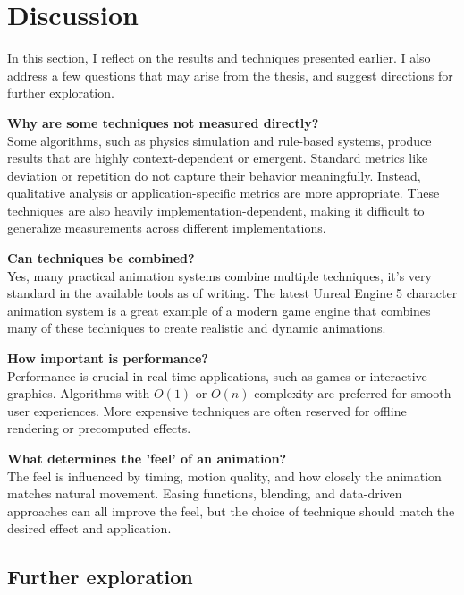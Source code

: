 \pagebreak

\section{Discussion}
\label{sec:discussion}

In this section, I reflect on the results and techniques presented earlier. I also address a few questions that may arise from the thesis, and suggest directions for further exploration.

	\textbf{Why are some techniques not measured directly?}\\
Some algorithms, such as physics simulation and rule-based systems, produce results that are highly context-dependent or emergent. Standard metrics like deviation or repetition do not capture their behavior meaningfully. Instead, qualitative analysis or application-specific metrics are more appropriate. These techniques are also heavily implementation-dependent, making it difficult to generalize measurements across different implementations.

	\textbf{Can techniques be combined?}\\
Yes, many practical animation systems combine multiple techniques, it's very standard in the available tools as of writing. The latest Unreal Engine 5 \cite{unreal-engine-5} character animation system is a great example of a modern game engine that combines many of these techniques to create realistic and dynamic animations.

	\textbf{How important is performance?}\\
Performance is crucial in real-time applications, such as games or interactive graphics. Algorithms with $O(1)$ or $O(n)$ complexity are preferred for smooth user experiences. More expensive techniques are often reserved for offline rendering or precomputed effects.

	\textbf{What determines the 'feel' of an animation?}\\
The feel is influenced by timing, motion quality, and how closely the animation matches natural movement. Easing functions, blending, and data-driven approaches can all improve the feel, but the choice of technique should match the desired effect and application.

\subsection{Further exploration}
\label{subsec:further-exploration}

